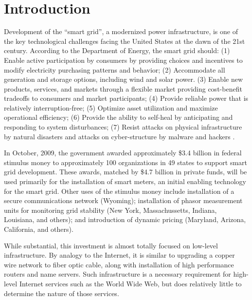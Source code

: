 
\section{Introduction}

Development of the ``smart grid'', a modernized power infrastructure, is
one of the key technological challenges facing the United States at the
dawn of the 21st century. According to the Department of Energy, the smart
grid should: (1) Enable active participation by consumers by providing
choices and incentives to modify electricity purchasing patterns and
behavior; (2) Accommodate all generation and storage options, including
wind and solar power.  (3) Enable new products, services, and markets
through a flexible market providing cost-benefit tradeoffs to consumers and
market participants; (4) Provide reliable power that is relatively
interruption-free; (5) Optimize asset utilization and maximize operational
efficiency; (6) Provide the ability to self-heal by anticipating and
responding to system disturbances; (7) Resist attacks on physical
infrastructure by natural disasters and attacks on cyber-structure by
malware and hackers \cite{NETL:GridCharacteristics}.

In October, 2009, the government awarded approximately \$3.4 billion in federal stimulus
money to approximately 100 organizations in 49 states to
support smart grid development.  These awards, matched by \$4.7
billion in private funds, will be used primarily for the
installation of smart meters, an initial enabling technology for the smart grid.
Other uses of the stimulus money include installation of a secure
communications network (Wyoming); installation of phasor measurement units
for monitoring grid stability (New York, Massachussetts, Indiana,
Louisiana, and others); and introduction of dynamic pricing (Maryland,
Arizona, California, and others).

While substantial, this investment is almost totally focused on low-level
infrastructure.  By analogy to the Internet, it is similar to upgrading a
copper wire network to fiber optic cable, along with installation of high
performance routers and name servers.  Such infrastructure is a necessary
requirement for high-level Internet services such as the World Wide Web,
but does relatively little to determine the nature of those services.

